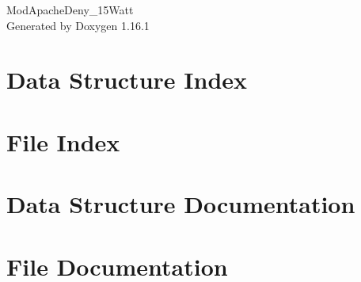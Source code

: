\documentclass[twoside]{book}
\newcommand{\+}{\discretionary{\mbox{\scriptsize$\hookleftarrow$}}{}{}}
\newcommand{\clearemptydoublepage}{%
    \newpage{\pagestyle{empty}\cleardoublepage}%
  }
\begin{document}
  \raggedbottom
    \hypersetup{pageanchor=false,
                bookmarksnumbered=true,
                pdfencoding=unicode
               }
  \begin{titlepage}
  \vspace*{7cm}
  \begin{center}%
  {\Large Mod\+Apache\+Deny\+\_\+15\+Watt}\\
  \vspace*{1cm}
  {\large Generated by Doxygen 1.16.1}\\
  \end{center}
  \end{titlepage}
  \clearemptydoublepage
  \tableofcontents
  \clearemptydoublepage
  \hypersetup{pageanchor=true}

\chapter{Data Structure Index}

\chapter{File Index}

\chapter{Data Structure Documentation}














\chapter{File Documentation}










  \backmatter
  \newpage
  \clearemptydoublepage
  \printindex
\end{document}
